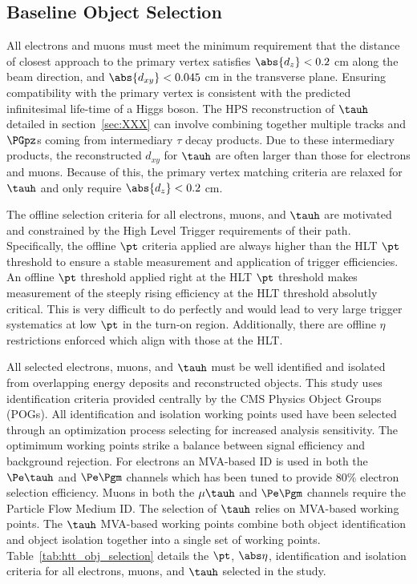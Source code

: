 \subsection{Baseline Object Selection}
All electrons and muons must meet the minimum requirement
that the distance of closest approach to the primary vertex satisfies $\abs{d_z}<0.2$ cm
along the beam direction, and $\abs{d_{xy}}<0.045$ cm in the transverse plane. Ensuring
compatibility with the primary vertex is consistent with the predicted infinitesimal life-time of
a Higgs boson. The HPS reconstruction of $\tauh$ detailed in section~\ref{sec:XXX} can involve
combining together multiple tracks and $\PGpz$s coming from intermediary $\tau$ decay products.
Due to these intermediary products, the reconstructed $d_{xy}$ for $\tauh$ are often
larger than those for electrons and muons. Because of this, the primary vertex matching
criteria are relaxed for $\tauh$ and only require $\abs{d_z}<0.2$ cm.

The offline selection criteria for all electrons, muons, and $\tauh$ are motivated and constrained
by the High Level Trigger requirements of their path. Specifically, the offline $\pt$ criteria
applied are always higher than the HLT $\pt$ threshold to ensure a stable measurement and application
of trigger efficiencies. An offline $\pt$ threshold applied right at the HLT $\pt$ threshold
makes measurement of the steeply rising efficiency at the HLT threshold absolutly critical.
This is very difficult to do perfectly and would lead to very large trigger systematics
at low $\pt$ in the turn-on region. Additionally, there are offline $\eta$ restrictions
enforced which align with those at the HLT.

All selected electrons, muons, and $\tauh$ must be well identified and isolated from overlapping
energy deposits and reconstructed objects. This study uses identification criteria
provided centrally by the CMS Physics Object Groups (POGs). All identification and isolation
working points used have been selected through an optimization process selecting
for increased analysis sensitivity. The optimimum working points strike a balance
between signal efficiency and background rejection. For electrons an MVA-based ID
is used in both the $\Pe\tauh$ and $\Pe\Pgm$ channels which has been tuned to provide 
80\% electron selection efficiency. Muons in both the $\mu\tauh$ and $\Pe\Pgm$ channels
require the Particle Flow Medium ID. The selection of $\tauh$ relies on MVA-based working
points. The $\tauh$ MVA-based working points combine both object identification and object
isolation together into a single set of working points. Table~\ref{tab:htt_obj_selection}
details the $\pt$, $\abs\eta$, identification and isolation criteria for all electrons, muons,
and $\tauh$ selected in the study.


